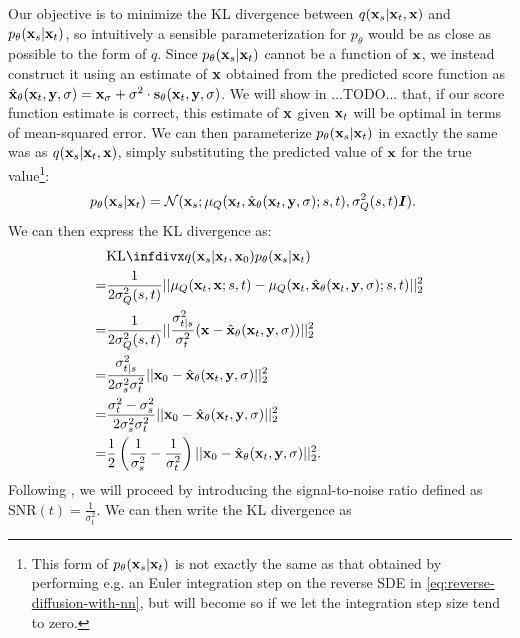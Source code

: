 Our objective is to minimize the KL divergence between $q({\mathbf{x}}_s|{\mathbf{x}}_t,{\mathbf{x}})$ and $p_\theta({\mathbf{x}}_{s}|{\mathbf{x}}_{t})$, so intuitively a sensible parameterization for $p_\theta$ would be as close as possible to the form of $q$. Since $p_\theta({\mathbf{x}}_{s}|{\mathbf{x}}_{t})$ cannot be a function of ${\mathbf{x}}$, we instead construct it using an estimate of ${\mathbf{x}}$ obtained from the predicted score function as $\hat{{\mathbf{x}}}_\theta({\mathbf{x}}_t, {\mathbf{y}}, \sigma) = {\mathbf{x}}_\sigma + \sigma^2 \cdot {\mathbf{s}}_\theta({\mathbf{x}}_t, {\mathbf{y}}, \sigma)$. 
We will show in ...TODO... that, if our score function estimate is correct, this estimate of ${\mathbf{x}}$ given ${\mathbf{x}}_t$ will be optimal in terms of mean-squared error.
We can then parameterize $p_\theta({\mathbf{x}}_{s} | {\mathbf{x}}_{t})$ in exactly the same was as $q({\mathbf{x}}_{s} | {\mathbf{x}}_{t},{\mathbf{x}})$, simply substituting the predicted value of ${\mathbf{x}}$ for the true value\footnote{This form of $p_\theta({\mathbf{x}}_{s} | {\mathbf{x}}_{t})$ is not exactly the same as that obtained by performing e.g. an Euler integration step on the reverse SDE in \cref{eq:reverse-diffusion-with-nn}, but will become so if we let the integration step size tend to zero. }:
\begin{align}
    p_\theta({\mathbf{x}}_{s} | {\mathbf{x}}_{t}) &= {\mathcal{N}}( {\mathbf{x}}_{s}; \mathbf{\mu}_Q({\mathbf{x}}_t, \hat{{\mathbf{x}}}_\theta({\mathbf{x}}_t, {\mathbf{y}}, \sigma); s, t), \sigma_Q^2(s, t) {\bm{I}} ).
\end{align}
We can then express the KL divergence as:
\begin{align}
    &\kl{q(\rvx_{s} | \rvx_{t}, \rvx_0)}{p_\theta(\rvx_{s} | \rvx_{t})} \\ 
    = &\frac{1}{2 \sigma_Q^2(s, t)} || \mathbf{\mu}_Q(\rvx_t, \rvx; s, t) - \mathbf{\mu}_Q(\rvx_t, \hat{\rvx}_\theta(\rvx_t, \rvy, \sigma); s, t) ||_2^2 \\
    = &\frac{1}{2 \sigma_Q^2(s, t)} || \frac{\sigma_{t|s}^2}{\sigma_t^2} ( \rvx - \hat{\rvx}_\theta(\rvx_t, \rvy, \sigma) ) ||_2^2 \\
    = &\frac{\sigma_{t|s}^2}{2 \sigma_s^2 \sigma_t^2} || \rvx_0 - \hat{\rvx}_\theta(\rvx_t, \rvy, \sigma) ||_2^2 \\
    = &\frac{\sigma_{t}^2 - \sigma_s^2}{2 \sigma_s^2 \sigma_t^2} || \rvx_0 - \hat{\rvx}_\theta(\rvx_t, \rvy, \sigma) ||_2^2 \\
    = &\frac{1}{2} \left( \frac{1}{\sigma_s^2} - \frac{1}{\sigma_t^2} \right) || \rvx_0 - \hat{\rvx}_\theta(\rvx_t, \rvy, \sigma) ||_2^2.
\end{align}
Following \citet{kingma2021variational}, we will proceed by introducing the signal-to-noise ratio defined as $\text{SNR}(t) = \frac{1}{\sigma_t^2}$. We can then write the KL divergence as
